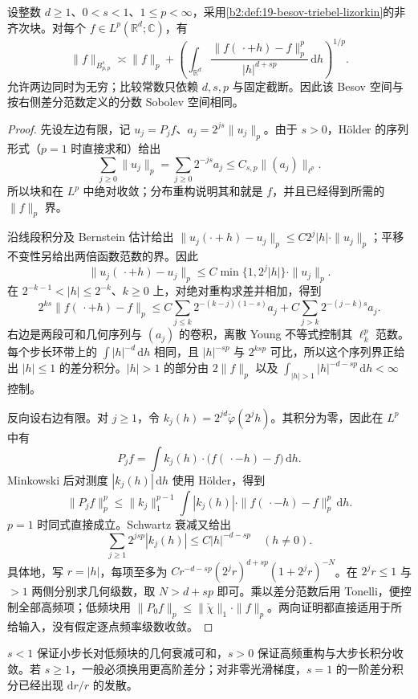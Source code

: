 \begin{proposition}\label{b2:prop:19-besov-difference}
设整数 \(d\geq1\)、\(0<s<1\)、\(1\leq p<\infty\)，采用\cref{b2:def:19-besov-triebel-lizorkin}的非齐次块。对每个 \(f\in L^p(\mathbb R^d;\mathbb C)\)，有
\[
 \|f\|_{B^s_{p,p}}\asymp
 \|f\|_p+
 \left(\int_{\mathbb R^d}
 \frac{\|f(\,\cdot+h)-f\|_p^p}{|h|^{d+sp}}\,\mathrm dh\right)^{1/p}.
\]
允许两边同时为无穷；比较常数只依赖 \(d,s,p\) 与固定截断。因此该 Besov 空间与按右侧差分范数定义的分数 Sobolev 空间相同。
\end{proposition}
\begin{proof}
先设左边有限，记 \(u_j=P_jf\)、\(a_j=2^{js}\|u_j\|_p\)。由于 \(s>0\)，Hölder 的序列形式（\(p=1\) 时直接求和）给出
\[
 \sum_{j\geq0}\|u_j\|_p
 =\sum_{j\geq0}2^{-js}a_j
 \leq C_{s,p}\|(a_j)\|_{\ell^p}.
\]
所以块和在 \(L^p\) 中绝对收敛；分布重构说明其和就是 \(f\)，并且已经得到所需的 \(\|f\|_p\) 界。

沿线段积分及 Bernstein 估计给出 \(\|u_j(\cdot+h)-u_j\|_p\leq C2^j|h|\cdot\|u_j\|_p\)；平移不变性另给出两倍函数范数的界。因此
\[
 \|u_j(\,\cdot+h)-u_j\|_p
 \leq C\min\{1,2^j|h|\}\cdot\|u_j\|_p.
\]
在 \(2^{-k-1}<|h|\leq2^{-k}\)、\(k\geq0\) 上，对绝对重构求差并相加，得到
\[
 2^{ks}\|f(\,\cdot+h)-f\|_p
 \leq C\sum_{j\leq k}2^{-(k-j)(1-s)}a_j
       +C\sum_{j>k}2^{-(j-k)s}a_j.
\]
右边是两段可和几何序列与 \((a_j)\) 的卷积，离散 Young 不等式控制其 \(\ell^p_k\) 范数。每个步长环带上的 \(\int|h|^{-d}\,\mathrm dh\) 相同，且 \(|h|^{-sp}\) 与 \(2^{ksp}\) 可比，所以这个序列界正给出 \(|h|\leq1\) 的差分积分。\(|h|>1\) 的部分由 \(2\|f\|_p\) 以及 \(\int_{|h|>1}|h|^{-d-sp}\,\mathrm dh<\infty\) 控制。

反向设右边有限。对 \(j\geq1\)，令 \(k_j(h)=2^{jd}\check\varphi(2^jh)\)。其积分为零，因此在 \(L^p\) 中有
\[
 P_jf=\int k_j(h)\cdot\bigl(f(\,\cdot-h)-f\bigr)\,\mathrm dh.
\]
Minkowski 后对测度 \(|k_j(h)|\,\mathrm dh\) 使用 Hölder，得到
\[
 \|P_jf\|_p^p
 \leq\|k_j\|_1^{p-1}
       \int|k_j(h)|\cdot\|f(\,\cdot-h)-f\|_p^p\,\mathrm dh.
\]
\(p=1\) 时同式直接成立。Schwartz 衰减又给出
\[
 \sum_{j\geq1}2^{jsp}|k_j(h)|\leq C|h|^{-d-sp}\quad(h\ne0).
\]
具体地，写 \(r=|h|\)，每项至多为 \(Cr^{-d-sp}(2^jr)^{d+sp}(1+2^jr)^{-N}\)。在 \(2^jr\leq1\) 与 \(>1\) 两侧分别求几何级数，取 \(N>d+sp\) 即可。乘以差分范数后用 Tonelli，便控制全部高频项；低频块用 \(\|P_0f\|_p\leq\|\check\chi\|_1\cdot\|f\|_p\)。两向证明都直接适用于所给输入，没有假定逐点频率级数收敛。
\end{proof}
\(s<1\) 保证小步长对低频块的几何衰减可和，\(s>0\) 保证高频重构与大步长积分收敛。若 \(s\geq1\)，一般必须换用更高阶差分；对非零光滑梯度，\(s=1\) 的一阶差分积分已经出现 \(\mathrm dr/r\) 的发散。

